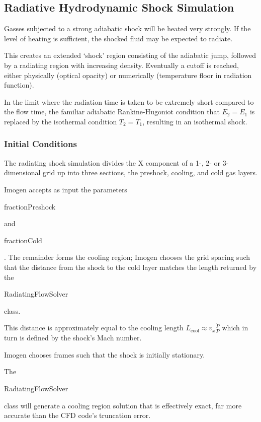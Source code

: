
\subsection{Radiative Hydrodynamic Shock Simulation}

Gasses subjected to a strong adiabatic shock will be heated very strongly. If the level of heating is sufficient,
the shocked fluid may be expected to radiate.

This creates an extended `shock' region consisting of the adiabatic jump, followed by a radiating region with
increasing density. Eventually a cutoff is reached, either physically (optical opacity) or numerically (temperature floor
in radiation function).

In the limit where the radiation time is taken to be extremely short compared to the flow time, the familiar
adiabatic Rankine-Hugoniot condition that $E_2 = E_1$ is replaced by the isothermal condition $T_2 = T_1$, resulting
in an isothermal shock.

\subsubsection{Initial Conditions}

The radiating shock simulation divides the X component of a 1-, 2- or 3-dimensional grid up into three
sections, the preshock, cooling, and cold gas layers.

Imogen accepts as input the parameters \begin{tt}fractionPreshock\end{tt} and \begin{tt}fractionCold\end{tt}.
The remainder forms the cooling region; Imogen chooses the grid spacing such that the distance from the shock
to the cold layer matches the length returned by the \begin{tt}RadiatingFlowSolver\end{tt} class.

This distance is approximately equal to the cooling length $L_{\text{cool}} \approx v_x \frac{\dot{P}}{P}$ which
in turn is defined by the shock's Mach number.

Imogen chooses frames such that the shock is initially stationary.

The \begin{tt}RadiatingFlowSolver\end{tt} class will generate a cooling region solution that is effectively exact, far
more accurate than the CFD code's truncation error.


